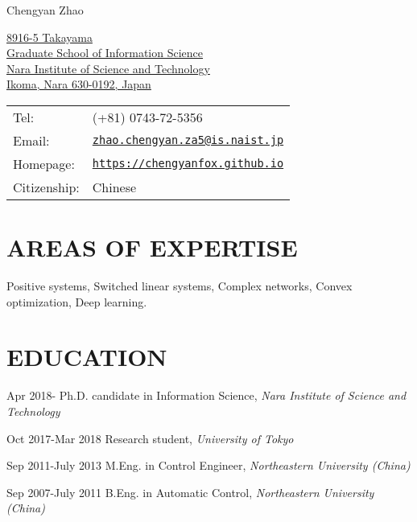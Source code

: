 \documentclass[letterpaper]{article}
\def\name{Chengyan Zhao}
\renewenvironment{itemize}{
  \begin{list}{}{
    \setlength{\leftmargin}{0em}
  }
}{
  \end{list}
}
\begin{document}
{\huge Chengyan Zhao }


\vspace{0.25in}

\begin{minipage}{0.45\linewidth}
  \href{}{8916-5 Takayama\\
  	Graduate School of Information Science\\
  	Nara Institute of Science and Technology \\
 Ikoma, Nara 630-0192, Japan \\}
\end{minipage}
\begin{minipage}{0.45\linewidth}
  \begin{tabular}{ll}
    Tel: & (+81) 0743-72-5356 \\
    Email: & \href{mailto:zhao.chengyan.za5@is.naist.jp}{\tt zhao.chengyan.za5@is.naist.jp} \\
    Homepage: & \href{https://chengyanfox.github.io/}{\tt https://chengyanfox.github.io} \\
    Citizenship: &Chinese
  \end{tabular}
\end{minipage}

\section*{AREAS OF EXPERTISE}

\begin{itemize}
	\item Positive systems, Switched linear systems, Complex networks, Convex optimization, Deep learning.
\end{itemize}

\section*{EDUCATION}

\begin{itemize}
  \item Apr 2018- \hspace{6.9em}Ph.D. candidate in Information Science, \textit{Nara Institute of Science and Technology}
  \item Oct 2017-Mar 2018 \hspace{3em}Research student, \textit{University of Tokyo}
  
   \item Sep 2011-July 2013 \hspace{3em}M.Eng. in Control Engineer,  \textit{Northeastern University (China)}
   
  \item Sep 2007-July 2011 \hspace{3em}B.Eng. in Automatic Control,  \textit{Northeastern University (China)} 
\end{itemize}
\end{document}
